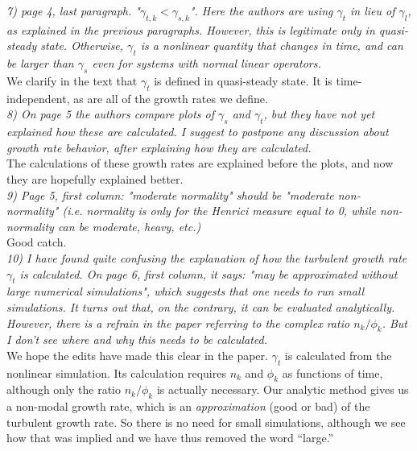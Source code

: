 \documentclass[12pt]{article}
\begin{document}
\emph{7) page 4, last paragraph. "$\gamma_{t,k}<\gamma_{s,k}$". Here the authors are using $\gamma_t$ in lieu of $\gamma_l$, as explained in the previous paragraphs. However, this is legitimate only in quasi-steady state. Otherwise, $\gamma_t$ is a nonlinear quantity that changes in time, and can be larger than $\gamma_s$ even for systems with normal linear operators. }\\

We clarify in the text that $\gamma_t$ is defined in quasi-steady state. It is time-independent, as are all of the growth rates we define.\\

\emph{8) On page 5 the authors compare plots of $\gamma_s$ and $\gamma_t$, but they have not yet explained how these are calculated. I suggest to postpone any discussion about growth rate behavior, after explaining how they are calculated. }\\

The calculations of these growth rates are explained before the plots, and now they are hopefully explained better.\\

\emph{9) Page 5, first column: "moderate normality" should be "moderate non-normality" (i.e. normality is only for the Henrici measure equal to 0, while non-normality can be moderate, heavy, etc.) }\\

Good catch.\\

\emph{10) I have found quite confusing the explanation of how the turbulent growth rate $\gamma_t$ is calculated. On page 6, first column, it says: "may be approximated without large numerical simulations", which suggests that one needs to run small simulations. It turns out that, on the contrary, it can be evaluated analytically. However, there is a refrain in the paper referring to the complex ratio $n_k/\phi_k$. But I don't see where and why this needs to be calculated. }\\

We hope the edits have made this clear in the paper. $\gamma_t$ is calculated from the nonlinear simulation. Its calculation requires $n_k$ and $\phi_k$ as functions of time, although only the ratio $n_k/\phi_k$ is actually necessary. Our analytic method gives us a non-modal growth rate, which is an \emph{approximation} (good or bad) of the turbulent growth rate. So there is no need for small simulations, although we see how that was implied and we have thus removed the word ``large.''\\
\end{document}
